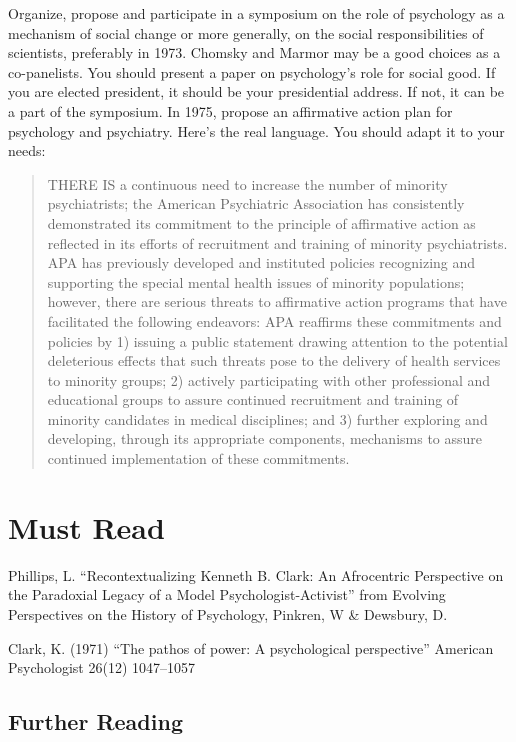 Organize, propose and participate in a symposium on the role of psychology as a mechanism of social change or more generally, on the social responsibilities of scientists, preferably in 1973. Chomsky and Marmor may be a good choices as a co-panelists. You should present a paper on psychology's role for social good. If you are elected president, it should be your presidential address. If not, it can be a part of the symposium.
In 1975, propose an affirmative action plan for psychology and psychiatry. Here's the real language. You should adapt it to your needs:

\begin{quote}

THERE IS a continuous need to increase the number of minority psychiatrists; the American Psychiatric Association has consistently demonstrated its commitment to the principle of affirmative action as reflected in its efforts of recruitment and training of minority psychiatrists. APA has previously developed and instituted policies recognizing and supporting the special mental health issues of minority populations; however, there are serious threats to affirmative action programs that have facilitated the following endeavors: APA reaffirms these commitments and policies by 1) issuing a public statement drawing attention to the potential deleterious effects that such threats pose to the delivery of health services to minority groups; 2) actively participating with other professional and educational groups to assure continued recruitment and training of minority candidates in medical disciplines; and 3) further exploring and developing, through its appropriate components, mechanisms to assure continued implementation of these commitments.
\end{quote}

\section{Must Read}
\label{mustread}

Phillips, L. “Recontextualizing Kenneth B. Clark: An Afrocentric Perspective on the Paradoxial Legacy of a Model Psychologist-Activist” from Evolving Perspectives on the History of Psychology, Pinkren, W \& Dewsbury, D.

Clark, K. (1971) “The pathos of power: A psychological perspective” American Psychologist 26(12) 1047--1057

\subsection{Further Reading}
\label{furtherreading}


